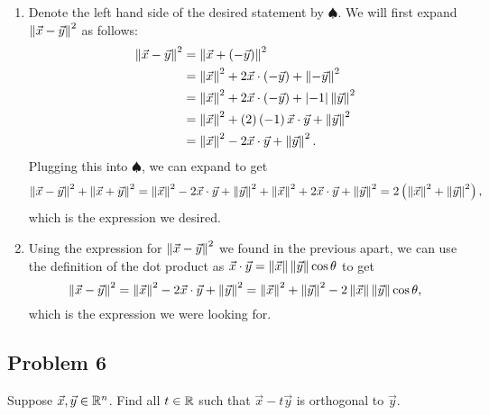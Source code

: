 \documentclass[main.tex]{subfiles}
\begin{document}
\begin{soln}
    \begin{enumerate}[label=(\alph*)]
        \item Denote the left hand side of the desired statement by $\spadesuit$. We will first expand $\left\lVert \vec{x} - \vec{y} \right\rVert^2$ as follows:
        \begin{align*}
            \left\lVert \vec{x} - \vec{y} \right\rVert^2 &= \left\lVert \vec{x} + \left( -\vec{y} \right) \right\rVert^2 \\
            &= \left\lVert \vec{x} \right\rVert^2 + 2\vec{x}\cdot\left( -\vec{y} \right) + \left\lVert -\vec{y} \right\rVert^2 \\
            &= \left\lVert \vec{x} \right\rVert^2 + 2\vec{x}\cdot \left( -\vec{y} \right) + \left\lvert -1 \right\rvert \left\lVert \vec{y} \right\rVert^2 \\
            &= \left\lVert \vec{x} \right\rVert^2 + \left( 2 \right)\left( -1 \right)\vec{x}\cdot \vec{y} + \left\lVert \vec{y} \right\rVert^2 \\
            &= \left\lVert \vec{x} \right\rVert^2 - 2\vec{x}\cdot \vec{y} + \left\lVert \vec{y} \right\rVert^2.
        \end{align*}
        Plugging this into $\spadesuit$, we can expand to get
        \[\left\lVert \vec{x} - \vec{y} \right\rVert^2 + \left\lVert \vec{x} + \vec{y} \right\rVert^2 = \left\lVert \vec{x} \right\rVert^2 - 2\vec{x}\cdot \vec{y} + \left\lVert \vec{y} \right\rVert^2 + \left\lVert \vec{x} \right\rVert^2 + 2\vec{x}\cdot \vec{y} + \left\lVert \vec{y} \right\rVert^2 = 2\left( \left\lVert \vec{x} \right\rVert^2 + \left\lVert \vec{y} \right\rVert^2 \right),\]
        which is the expression we desired.
        \item Using the expression for $\left\lVert \vec{x} - \vec{y} \right\rVert^2$ we found in the previous apart, we can use the definition of the dot product as $\vec{x}\cdot \vec{y} = \left\lVert \vec{x} \right\rVert\left\lVert \vec{y} \right\rVert\cos \theta$ to get
        \[\left\lVert \vec{x} - \vec{y} \right\rVert^2 = \left\lVert \vec{x} \right\rVert^2 - 2\vec{x}\cdot \vec{y} + \left\lVert \vec{y} \right\rVert^2 = \left\lVert \vec{x} \right\rVert^2 + \left\lVert \vec{y} \right\rVert^2 - 2\left\lVert \vec{x} \right\rVert\left\lVert \vec{y} \right\rVert\cos \theta,\]
        which is the expression we were looking for.\qedhere
    \end{enumerate}
\end{soln}
\eject

\subsection{Problem 6}
\begin{claim}
    Suppose $\vec{x},\vec{y} \in\mathbb R^n$. Find all $t \in\mathbb R$ such that $\vec{x} - t\vec{y}$ is orthogonal to $\vec{y}$.
\end{claim}
\end{document}

